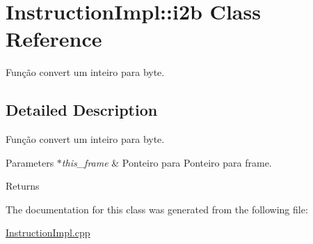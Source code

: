 \hypertarget{class_instruction_impl_1_1i2b}{}\section{Instruction\+Impl\+:\+:i2b Class Reference}
\label{class_instruction_impl_1_1i2b}


Função convert um inteiro para byte.  




\subsection{Detailed Description}
Função convert um inteiro para byte. 


\begin{DoxyParams}{Parameters}
{\em $\ast$this\+\_\+frame} & Ponteiro para Ponteiro para frame. \\
\hline
\end{DoxyParams}
\begin{DoxyReturn}{Returns}

\end{DoxyReturn}


The documentation for this class was generated from the following file\+:\begin{DoxyCompactItemize}
\item 
\hyperlink{_instruction_impl_8cpp}{Instruction\+Impl.\+cpp}\end{DoxyCompactItemize}
